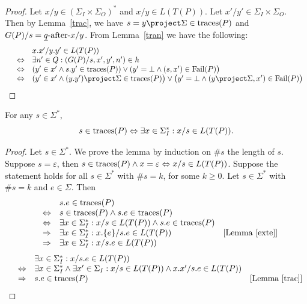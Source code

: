 \begin{proof}
Let $x/y\in (\Sigma_I\times \Sigma_O)^*$ and $x/y\in L(T(P))$. Let $x'/y'\in \Sigma_I\times \Sigma_O$. Then by Lemma~\ref{trac}, we have $s=y\project \Sigma\in \trc(P)$ and $G(P)/s=\underline q\text{-after-} x/y$. From Lemma~\ref{tran} we have the following:
\[\begin{array}{lll}
&&x.x'/y.y'\in L(T(P)) \\&\Leftrightarrow & \exists n'\in Q: (G(P)/s,x',y',n')\in h\\
&\Leftrightarrow & (y'\in x'\wedge s.y'\in \trc(P))\vee (y'=\bot\wedge (s, x')\in {\text {\rm Fail}}(P)\big)\\
&\Leftrightarrow & (y'\in x'\wedge (y.y')\project \Sigma\in \trc(P)\big)\vee \big(y'=\bot\wedge (y\project \Sigma, x')\in {\text {\rm Fail}}(P)\big)\end{array}
\]
\end{proof}


\begin{lemma}\label{cont}
For any $s\in \Sigma^*$,
$$s\in \text{traces}(P) \Leftrightarrow \exists x\in \Sigma_I^*: x/s \in L(T(P)).$$
\end{lemma}
%
\begin{proof}
Let $s\in \Sigma^*$. We prove the lemma by induction on $\#s$ the length of $s$. Suppose $s=\varepsilon $, then $s\in \text{traces}(P)\wedge x=\varepsilon \Leftrightarrow x/s\in L(T(P))$. Suppose the statement holds for all $s\in \Sigma^*$ with $\#s=k$, for some $k\ge 0$. Let $s\in \Sigma^*$ with $\#s=k$ and $e\in\Sigma$.
Then \[\begin{array}{llll}
&& s.e\in \text{traces}(P)\\
&\Leftrightarrow & s\in \text{traces}(P)\wedge s.e\in \text{traces}(P)\\
&\Leftrightarrow &  \exists x\in \Sigma_I^*: x/s\in L(T(P))\wedge s.e\in \text{traces}(P)\\
&\Rightarrow & \exists x\in \Sigma_I^*: x.\{e\}/s.e\in L(T(P))&[{\text{Lemma~\ref{exte}}}]\\
&\Rightarrow & \exists x\in \Sigma_I^*: x/s.e\in L(T(P))
\end{array}
\]
 \[\begin{array}{llll}
&& \exists x\in \Sigma_I^*: x/s.e\in L(T(P))\\
&\Leftrightarrow & \exists x\in \Sigma_I^*\wedge \exists x'\in \Sigma_I: x/s\in L(T(P))\wedge x.x'/s.e\in L(T(P))\\
&\Rightarrow & s.e\in \text{traces}(P)&[{\text{Lemma~\ref{trac}}}]\\
\end{array}
\]
\end{proof}

